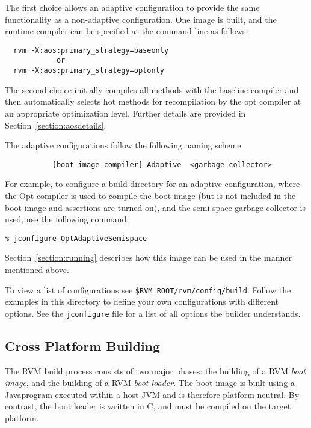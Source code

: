 The first choice allows an adaptive configuration to provide the same
functionality as a non-adaptive configuration.  One image is built,
and the runtime compiler can be specified at the command line as
follows:
\begin{verbatim}
  rvm -X:aos:primary_strategy=baseonly
            or
  rvm -X:aos:primary_strategy=optonly
\end{verbatim}

The second choice initially compiles all methods with the
baseline compiler and then automatically selects hot methods for
recompilation by the opt compiler at an appropriate optimization
level. Further details are provided in Section~\ref{section:aosdetails}.

The adaptive configurations follow the following naming scheme
\begin{verbatim}
           [boot image compiler] Adaptive  <garbage collector>
\end{verbatim}

For example, to configure a build 
directory for an adaptive configuration, where the Opt compiler is 
used to compile the boot image (but is not included in the boot image
and assertions are turned on), and the semi-space garbage collector is
used, use the following command:

\begin{verbatim}
% jconfigure OptAdaptiveSemispace
\end{verbatim}

Section~\ref{section:running} describes how this image can be used in
the manner mentioned above.

To view a list of configurations see 
{\tt \$RVM\_ROOT/rvm/config/build}.  Follow the examples in this
directory to define your own configurations with different options.  See
the {\tt jconfigure} file for a list of all options the builder
understands.

\subsection{Cross Platform Building}

The RVM build process consists of two major phases: the building of a
RVM {\em boot image}, and the building of a RVM {\em boot loader}.
The boot image is built using a Java\trademark program executed within a host
JVM and is therefore platform-neutral.  By contrast, the boot loader
is written in C, and must be compiled on the target platform.


